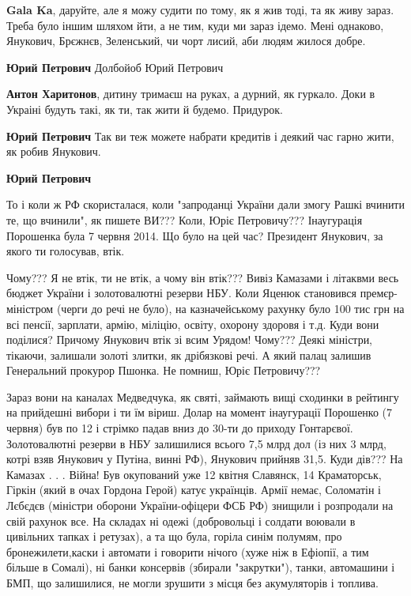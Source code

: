 \begin{itemize}
\begin{itemize}
\textbf{Gala Ka}, даруйте, але я можу судити по тому, як я жив тоді, та як живу зараз. Треба було іншим шляхом йти, а не тим, куди ми зараз ідемо. Мені однаково, Янукович, Брєжнєв, Зеленський, чи чорт лисий, аби людям жилося добре.


\textbf{Юрий Петрович} Долбойоб Юрий Петрович


\textbf{Антон Харитонов}, дитину тримаєш на руках, а дурний, як гуркало. Доки в Украіні будуть такі, як ти, так жити й будемо. Придурок.


\textbf{Юрий Петрович} Так ви теж можете набрати кредитів і деякий час гарно жити, як робив Янукович.


\textbf{Юрий Петрович} 

То і коли ж РФ скористалася, коли "запроданці України дали змогу Рашкі вчинити
те, що вчинили", як пишете ВИ??? Коли, Юріє Петровичу??? Інаугурація Порошенка
була 7 червня 2014. Що було на цей час? Президент Янукович, за якого ти
голосував, втік. 

Чому??? Я не втік, ти не втік, а чому він втік??? Вивіз
Камазами і літаквми весь бюджет України і золотовалютні резерви НБУ. Коли
Яценюк становився премєр-міністром (черги до речі не було), на казначейському
рахунку було 100 тис грн на всі пенсії, зарплати, армію, міліцію, освіту,
охорону здоровя і т.д. Куди вони поділися? Причому Янукович втік зі всим
Урядом! Чому??? Деякі міністри, тікаючи, залишали золоті злитки, як дрібязкові
речі. А який палац залишив Генеральний прокурор Пшонка. Не помниш, Юріє
Петровичу???

Зараз вони на каналах Медведчука, як святі, займають вищі сходинки в рейтингу
на прийдешні вибори і ти їм віриш. Долар на момент інаугурації Порошенко (7
червня) був по 12 і стрімко падав вниз до 30-ти до приходу Гонтарєвої.
Золотовалютні резерви в НБУ залишилися всього 7,5 млрд дол (із них 3 млрд,
котрі взяв Янукович у Путіна, винні РФ), Янукович прийняв 31,5. Куди дів??? На
Камазах . . . Війна! Був окупований уже 12 квітня Славянск, 14 Краматорськ,
Гіркін (який в очах Гордона Герой) катує українців. Армії немає, Соломатін і
Лєбєдєв (міністри оборони України-офіцери ФСБ РФ) знищили і розпродали на свій
рахунок все. На складах ні одежі (добровольці і солдати воювали в цивільних
тапках і ретузах), а та що була, горіла синім полумям, про бронежилети,каски і
автомати і говорити нічого (хуже ніж в Ефіопії, а тим більше в Сомалі), ні
банки консервів (збирали "закрутки"), танки, автомашини і БМП, що залишилися,
не могли зрушити з місця без акумуляторів і топлива. 


\end{itemize}
\end{itemize}
